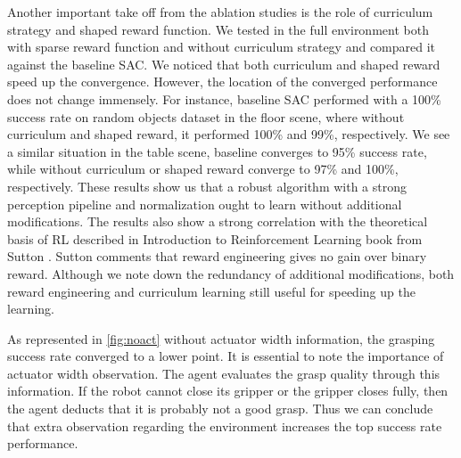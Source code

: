 Another important take off from the ablation studies is the role of curriculum strategy and shaped reward function. We tested in the full environment both with sparse reward function and without curriculum strategy and compared it against the baseline SAC. We noticed that both curriculum and shaped reward speed up the convergence. However, the location of the converged performance does not change immensely. For instance, baseline SAC performed with a 100\% success rate on random objects dataset in the floor scene, where without curriculum and shaped reward, it performed 100\% and 99\%, respectively. We see a similar situation in the table scene, baseline converges to 95\% success rate, while without curriculum or shaped reward converge to 97\% and 100\%, respectively. These results show us that a robust algorithm with a strong perception pipeline and normalization ought to learn without additional modifications. The results also show a strong correlation with the theoretical basis of RL described in Introduction to Reinforcement Learning book from Sutton \cite{Sutton2018}. Sutton comments that reward engineering gives no gain over binary reward. Although we note down the redundancy of additional modifications, both reward engineering and curriculum learning still useful for speeding up the learning.

As represented in \ref{fig:noact} without actuator width information, the grasping success rate converged to a lower point. It is essential to note the importance of actuator width observation. The agent evaluates the grasp quality through this information. If the robot cannot close its gripper or the gripper closes fully, then the agent deducts that it is probably not a good grasp. Thus we can conclude that extra observation regarding the environment increases the top success rate performance.





